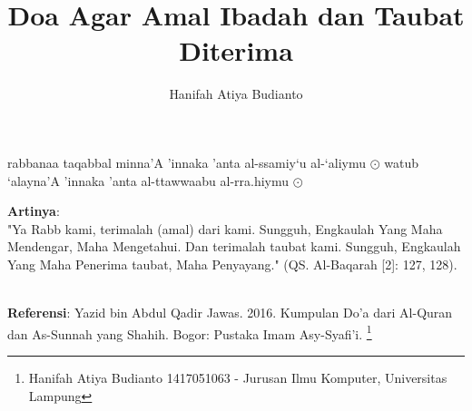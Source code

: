 \documentclass[a4paper,12pt]{article}
\title{\Large Doa Agar Amal Ibadah dan Taubat Diterima}
\author{\calligra Hanifah Atiya Budianto}
\begin{document}
\sffamily
\maketitle 
\fullvocalize
{}
\begin{arabtext}
\noindent
rabbanaa taqabbal minna'A 'innaka 'anta al-ssamiy`u al-`aliymu $\odot$ 
watub `alayna'A 'innaka 'anta al-ttawwaabu al-rra.hiymu $\odot$ 
\end{arabtext}
\noindent
\textbf{Artinya}:\\
\indent
"Ya Rabb kami, terimalah (amal) dari kami. Sungguh, Engkaulah Yang Maha 
Mendengar, Maha Mengetahui. Dan terimalah taubat kami. Sungguh, Engkaulah 
Yang Maha Penerima taubat, Maha Penyayang." (QS. Al-Baqarah [2]: 127, 128).
\\\\
\par
\noindent
\textbf{Referensi}: Yazid bin Abdul Qadir Jawas. 2016. Kumpulan Do'a dari
Al-Quran dan As-Sunnah yang Shahih. Bogor: Pustaka Imam Asy-Syafi'i.
\footnote{Hanifah Atiya Budianto 1417051063 - Jurusan Ilmu Komputer,
Universitas Lampung}
\end{document}
